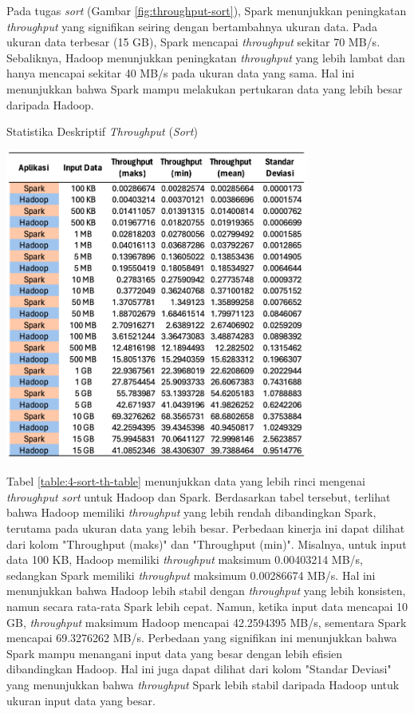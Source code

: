 Pada tugas \textit{sort} (Gambar \ref{fig:throughput-sort}), Spark menunjukkan peningkatan \textit{throughput} yang signifikan seiring dengan bertambahnya ukuran data. Pada ukuran data terbesar (15 GB), Spark mencapai \textit{throughput} sekitar 70 MB/s. Sebaliknya, Hadoop menunjukkan peningkatan \textit{throughput} yang lebih lambat dan hanya mencapai sekitar 40 MB/s pada ukuran data yang sama. Hal ini menunjukkan bahwa Spark mampu melakukan pertukaran data yang lebih besar daripada Hadoop.

\begin{table}[h]
  \centering
  \caption{Statistika Deskriptif \textit{Throughput} (\textit{Sort})}
  \includegraphics[width=0.75\textwidth]{figures/ch04/4-sort-th-table}
  \label{table:4-sort-th-table}
\end{table}

Tabel \ref{table:4-sort-th-table} menunjukkan data yang lebih rinci mengenai \textit{throughput} \textit{sort} untuk Hadoop dan Spark. Berdasarkan tabel tersebut, terlihat bahwa Hadoop memiliki \textit{throughput} yang lebih rendah dibandingkan Spark, terutama pada ukuran data yang lebih besar.
Perbedaan kinerja ini dapat dilihat dari kolom "Throughput (maks)" dan "Throughput (min)". Misalnya, untuk input data 100 KB, Hadoop memiliki \textit{throughput} maksimum 0.00403214 MB/s, sedangkan Spark memiliki \textit{throughput} maksimum 0.00286674 MB/s. Hal ini menunjukkan bahwa Hadoop lebih stabil dengan \textit{throughput} yang lebih konsisten, namun secara rata-rata Spark lebih cepat. Namun, ketika input data mencapai 10 GB, \textit{throughput} maksimum Hadoop mencapai 42.2594395 MB/s, sementara Spark mencapai 69.3276262 MB/s. Perbedaan yang signifikan ini menunjukkan bahwa Spark mampu menangani input data yang besar dengan lebih efisien dibandingkan Hadoop. Hal ini juga dapat dilihat dari kolom "Standar Deviasi" yang menunjukkan bahwa \textit{throughput} Spark lebih stabil daripada Hadoop untuk ukuran input data yang besar.

